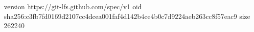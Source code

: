 version https://git-lfs.github.com/spec/v1
oid sha256:c3fb7fd0169d2107cc4dcea001faf4d142b4ce4b0c7d9224aeb263cc8f57eac9
size 262240
